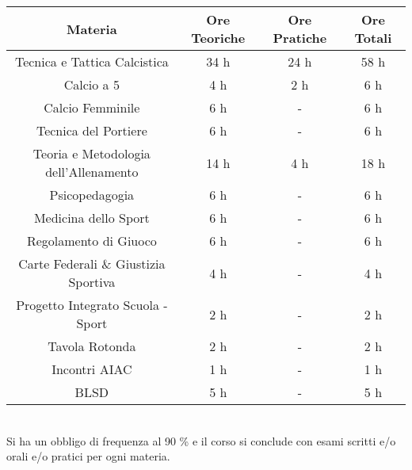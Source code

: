 \documentclass[../uefaC.tex]{subfiles}
\begin{document}
\FloatBarrier
\begin{table}[h!]
\begin{tabular}{|c|c|c|c|}
\hline
\textbf{Materia}                      & \textbf{Ore Teoriche} & \textbf{Ore Pratiche} & \textbf{Ore Totali} \\ \hline
Tecnica e Tattica Calcistica          & 34 h                  & 24 h                  & 58 h                \\ \hline
Calcio a 5                            & 4 h                   & 2 h                   & 6 h                 \\ \hline
Calcio Femminile                      & 6 h                   & -                     & 6 h                 \\ \hline
Tecnica del Portiere                  & 6 h                   & -                     & 6 h                 \\ \hline
Teoria e Metodologia dell'Allenamento & 14 h                  & 4 h                   & 18 h                \\ \hline
Psicopedagogia                        & 6 h                   & -                     & 6 h                 \\ \hline
Medicina dello Sport                  & 6 h                   & -                     & 6 h                 \\ \hline
Regolamento di Giuoco                 & 6 h                   & -                     & 6 h                 \\ \hline
Carte Federali \& Giustizia Sportiva  & 4 h                   & -                     & 4 h                 \\ \hline
Progetto Integrato Scuola - Sport     & 2 h                   & -                     & 2 h                 \\ \hline
Tavola Rotonda                        & 2 h                   & -                     & 2 h                 \\ \hline
Incontri AIAC                         & 1 h                   & -                     & 1 h                 \\ \hline
BLSD                                  & 5 h                   & -                     & 5 h                 \\ \hline
\end{tabular}
\end{table}
\FloatBarrier
\hfill \\


Si ha un obbligo di frequenza al 90 \% e il corso si conclude con esami scritti e/o orali e/o pratici per ogni materia.
\end{document}
